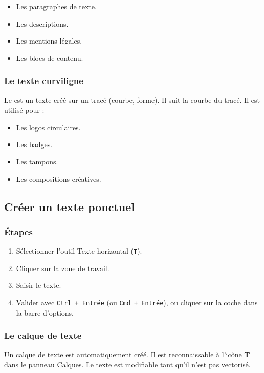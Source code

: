 \begin{itemize}
    \item Les paragraphes de texte.
    \item Les descriptions.
    \item Les mentions légales.
    \item Les blocs de contenu.
\end{itemize}

\subsubsection{Le texte curviligne}

Le  est un texte créé sur un tracé (courbe, forme). Il suit la courbe du tracé. Il est utilisé pour :

\begin{itemize}
    \item Les logos circulaires.
    \item Les badges.
    \item Les tampons.
    \item Les compositions créatives.
\end{itemize}

\subsection{Créer un texte ponctuel}

\subsubsection{Étapes}

\begin{enumerate}
    \item Sélectionner l'outil Texte horizontal (\texttt{T}).
    \item Cliquer sur la zone de travail.
    \item Saisir le texte.
    \item Valider avec \texttt{Ctrl + Entrée} (ou \texttt{Cmd + Entrée}), ou cliquer sur la coche dans la barre d'options.
\end{enumerate}

\subsubsection{Le calque de texte}

Un calque de texte est automatiquement créé. Il est reconnaissable à l'icône \textbf{T} dans le panneau Calques. Le texte est modifiable tant qu'il n'est pas vectorisé.

